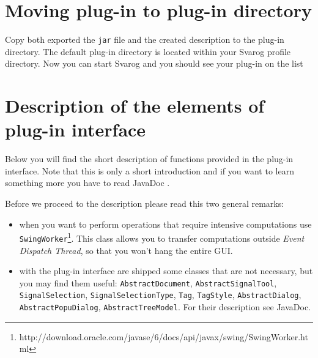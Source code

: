 \documentclass{article}
\begin{document}
\section{Moving plug-in to plug-in directory}
\label{move}

Copy both exported the \verb=jar= file and the created description to the plug-in directory.
The default plug-in directory is located within your Svarog profile directory.
Now you can start Svarog and you should see your plug-in on the list \smiley

\section{Description of the elements of plug-in interface}

Below you will find the short description of functions provided in the plug-in interface.
Note that this is only a short introduction and if you want to learn something more you have to read JavaDoc \smiley.

Before we proceed to the description please read this two general remarks:
\begin{itemize}
	\item when you want to perform operations that require intensive computations use \verb=SwingWorker=\footnote{http://download.oracle.com/javase/6/docs/api/javax/swing/SwingWorker.html}.
		This class allows you to transfer computations outside \textit{Event Dispatch Thread}, so that you won't hang the entire GUI.
	\item with the plug-in interface are shipped some classes that are not necessary, but you may find them useful: \verb=AbstractDocument=, \verb=AbstractSignalTool=, \verb=SignalSelection=,
		\verb=SignalSelectionType=, \verb=Tag=, \verb=TagStyle=, \verb=AbstractDialog=, \verb=AbstractPopuDialog=, \verb=AbstractTreeModel=.
		For their description see JavaDoc.
\end{itemize}
\end{document}
